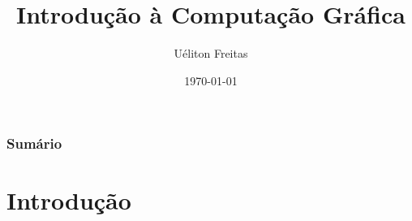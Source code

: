 \documentclass{beamer}
\title[Computação Gráfica]{Introdução à Computação Gráfica} %
\author{Uéliton Freitas} %
\institute[UFMS] %
{
Universidade Católica Don Bosco - UCDB \\ %
\medskip
\textit{freitas.ueliton@gmail.com} %
}
\date{\today} %
\begin{document}
\begin{frame}
\titlepage %
\end{frame}

\begin{frame}
\frametitle{Sumário} %
\tableofcontents %
\end{frame}





\section{Introdução} 

\end{document}
